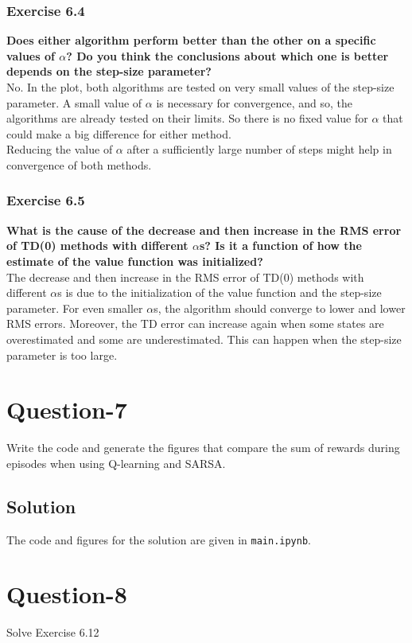 \documentclass[11pt]{article}
\begin{document}
    \subsubsection*{Exercise 6.4}
    \textbf{Does either algorithm perform better than the other on a specific values of $\alpha$? Do you think
    the conclusions about which one is better depends on the step-size parameter?} \\[5pt]
    No. In the plot, both algorithms are tested on very small values of the step-size parameter. A small
    value of $\alpha$ is necessary for convergence, and so, the algorithms are already tested on
    their limits. So there is no fixed value for $\alpha$ that could make a big difference for
    either method. \\
    Reducing the value of $\alpha$ after a sufficiently large number of steps might help in convergence
    of both methods.

    \subsubsection*{Exercise 6.5}
    \textbf{What is the cause of the decrease and then increase in the RMS error of TD(0) methods with different
    $\alpha$s? Is it a function of how the estimate of the value function was initialized?} \\[5pt]
    The decrease and then increase in the RMS error of TD(0) methods with different $\alpha$s is due to the
    initialization of the value function and the step-size parameter. For even smaller $\alpha$s, the
    algorithm should converge to lower and lower RMS errors. Moreover, the TD error can increase again
    when some states are overestimated and some are underestimated. This can happen when the step-size
    parameter is too large.

    \section*{Question-7}
    Write the code and generate the figures that compare the sum of rewards during episodes
    when using Q-learning and SARSA.

    \subsection*{Solution}
    The code and figures for the solution are given in \texttt{main.ipynb}.

    \section*{Question-8}
    Solve Exercise 6.12
\end{document}
